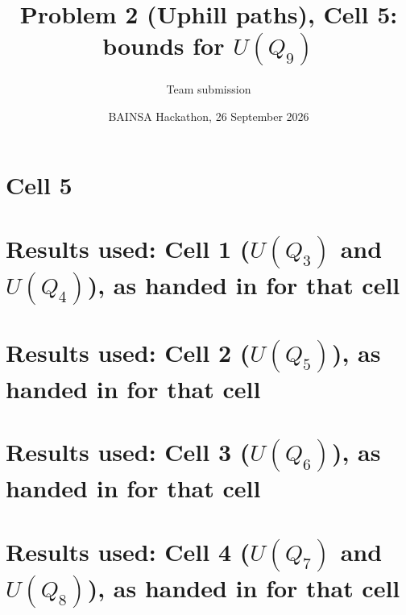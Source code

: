
\title{Problem 2 (Uphill paths), Cell 5: bounds for $U(Q_9)$}
\author{Team submission}
\date{BAINSA Hackathon, 26 September 2026}
\maketitle
\section{Cell 5}

\appendix
\section{Results used: Cell 1 ($U(Q_3)$ and $U(Q_4)$), as handed in for that cell}

\section{Results used: Cell 2 ($U(Q_5)$), as handed in for that cell}

\section{Results used: Cell 3 ($U(Q_6)$), as handed in for that cell}

\section{Results used: Cell 4 ($U(Q_7)$ and $U(Q_8)$), as handed in for that cell}


